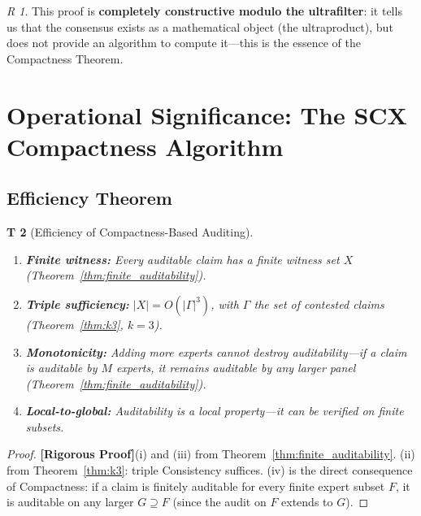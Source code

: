 \documentclass[12pt,a4paper]{article}
\newtheorem{theorem}Theorem[section]
\theoremstyle{remark}
\newtheorem{remark}[theorem]Remark
\newcommand{\rigorous}{\textnormal{\textbf{[Rigorous Proof]}}}
\begin{document}
\begin{remark}
This proof is \textbf{completely constructive modulo the ultrafilter}: it tells us that the consensus exists as a mathematical object (the ultraproduct), but does not provide an algorithm to compute it---this is the essence of the Compactness Theorem.
\end{remark}
\section{Operational Significance: The SCX Compactness Algorithm}
\subsection{Efficiency Theorem}
\begin{theorem}[Efficiency of Compactness-Based Auditing]\label{thm:efficiency}
\begin{enumerate}[label=(\roman*),itemsep=4pt]
    \item \textbf{Finite witness:} Every auditable claim has a finite witness set \(X\) (Theorem~\ref{thm:finite_auditability}).
    \item \textbf{Triple sufficiency:} \(|X| = O(|\Gamma|^3)\), with \(\Gamma\) the set of contested claims (Theorem~\ref{thm:k3}, \(k=3\)).
    \item \textbf{Monotonicity:} Adding more experts cannot destroy auditability---if a claim is auditable by \(M\) experts, it remains auditable by any larger panel (Theorem~\ref{thm:finite_auditability}).
    \item \textbf{Local-to-global:} Auditability is a local property---it can be verified on finite subsets.
\end{enumerate}
\end{theorem}
\begin{proof}
\rigorous (i) and (iii) from Theorem~\ref{thm:finite_auditability}. (ii) from Theorem~\ref{thm:k3}: triple Consistency suffices. (iv) is the direct consequence of Compactness: if a claim is finitely auditable for every finite expert subset \(F\), it is auditable on any larger \(G \supseteq F\) (since the audit on \(F\) extends to \(G\)).
\end{proof}
\end{document}
